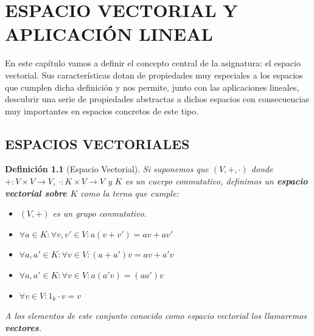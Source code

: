 \documentclass[10pt,a4paper,openright]{book}
\theoremstyle{break}
\newtheorem*{defi}{Definición}
\begin{document}
\chapter{ESPACIO VECTORIAL Y \\APLICACIÓN LINEAL}
En este capítulo vamos a definir el concepto central de la asignatura: el espacio vectorial. Sus características dotan de propiedades muy especiales a los espacios que cumplen dicha definición y nos permite, junto con las aplicaciones lineales, descubrir una serie de propiedades abstractas a dichos espacios con consecuencias muy importantes en espacios concretos de este tipo.

\section{ESPACIOS VECTORIALES}
\begin{defi}[Espacio Vectorial]
Si suponemos que $(V,+,\cdot)$ donde $+: V\times V\rightarrow V$, $\cdot : K\times V\rightarrow V$ y $K$ es un cuerpo conmutativo, definimos un \textbf{espacio vectorial sobre $K$} como la terna que cumple:
\begin{itemize}
\item $(V,+)$ es un grupo conmutativo.

\item $\forall a \in K: \forall v,v'\in V: a(v+v')=av+av'$

\item $\forall a,a' \in K: \forall v\in V: (a+a')v=av+a'v$

\item $\forall a,a'\in K: \forall v \in V: a(a'v)=(aa')v$

\item $\forall v\in V: 1_k\cdot v=v$
\end{itemize}
A los elementos de este conjunto conocido como espacio vectorial los llamaremos \textbf{vectores}.
\end{defi}
\end{document}
